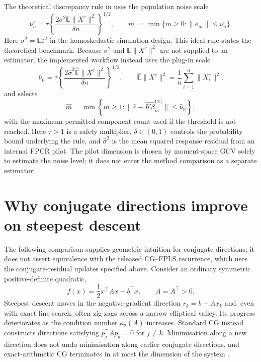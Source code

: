 The theoretical discrepancy rule in
\textcite{babii_carrasco_tsafack_2026} uses the population noise scale
\begin{equation}
    \nu_n^\circ
    =\tau\left\{
      \frac{2\sigma^2\mathbb E\|X^c\|^2}{\delta n}
      \right\}^{1/2},
    \qquad
    m^\circ=\min\{m\geq0:\|e_m\|\leq\nu_n^\circ\}.
    \label{eq:methods-cg-ideal-threshold}
\end{equation}
Here $\sigma^2=\mathbb E\varepsilon^2$ in the homoskedastic simulation
design.  This ideal rule states the theoretical benchmark.  Because $\sigma^2$ and
$\mathbb E\|X^c\|^2$ are not supplied to an estimator, the implemented
workflow instead uses the plug-in scale
\begin{equation}
    \widehat\nu_n
    =\tau\left\{
      \frac{2\widehat\sigma^2\widehat{\mathbb E}\|X^c\|^2}
           {\delta n}\right\}^{1/2},
    \qquad
    \widehat{\mathbb E}\|X^c\|^2
    =\frac1n\sum_{i=1}^{n}\|X_i^c\|^2.
    \label{eq:methods-cg-threshold}
\end{equation}
and selects
\begin{equation}
    \widehat m
    =\min\left\{m\geq1:
      \|\widehat r-\widehat K\widehat\beta_m^{\mathrm{CG}}\|
      \leq\widehat\nu_n\right\},
    \label{eq:methods-cg-stopping-rule}
\end{equation}
with the maximum permitted component count used if the threshold is not
reached.  Here $\tau>1$ is a safety multiplier, $\delta\in(0,1)$ controls
the probability bound underlying the rule, and $\widehat\sigma^2$ is the
mean squared response residual from an internal FPCR pilot.  The pilot
dimension is chosen by moment-space GCV solely to estimate the noise level;
it does not enter the method comparison as a separate estimator.

\section{Why conjugate directions improve on steepest descent}
\label{sec:methods-cg-versus-sd}

The following comparison supplies geometric intuition for conjugate
directions; it does not assert equivalence with the released CG--FPLS
recurrence, which uses the conjugate-residual updates specified above.
Consider an ordinary symmetric positive-definite quadratic,
\begin{equation}
    f(x)=\frac12x^\top Ax-b^\top x,
    \qquad A=A^\top>0.
    \label{eq:methods-spd-quadratic}
\end{equation}
Steepest descent moves in the negative-gradient direction
$r_k=b-Ax_k$ and, even with exact line search, often zig-zags across a narrow
elliptical valley.  Its progress deteriorates as the condition number
$\kappa_2(A)$ increases.  Standard CG instead constructs directions satisfying
$p_j^\top Ap_k=0$ for $j\neq k$.  Minimisation along a new direction does
not undo minimisation along earlier conjugate directions, and exact-arithmetic
CG terminates in at most the dimension of the system
\parencite{hestenes_stiefel_1952}.

